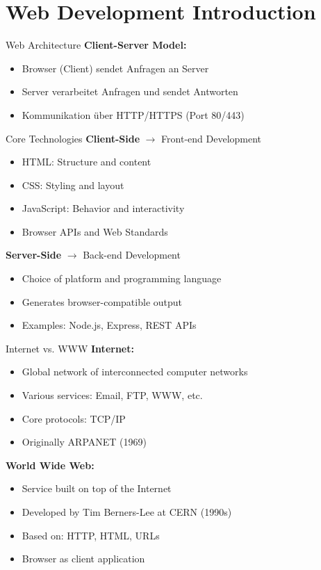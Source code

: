 \section{Web Development Introduction}

\begin{definition}{Web Architecture}
    \textbf{Client-Server Model:}
    \begin{itemize}
        \item Browser (Client) sendet Anfragen an Server
        \item Server verarbeitet Anfragen und sendet Antworten
        \item Kommunikation über HTTP/HTTPS (Port 80/443)
    \end{itemize}
\end{definition}

\begin{concept}{Core Technologies}
    \textbf{Client-Side} $\rightarrow$ Front-end Development
    \begin{itemize}
        \item HTML: Structure and content
        \item CSS: Styling and layout
        \item JavaScript: Behavior and interactivity
        \item Browser APIs and Web Standards
    \end{itemize}

    \textbf{Server-Side} $\rightarrow$ Back-end Development
    \begin{itemize}
        \item Choice of platform and programming language
        \item Generates browser-compatible output
        \item Examples: Node.js, Express, REST APIs
    \end{itemize}
\end{concept}

\begin{theorem}{Internet vs. WWW}
    \textbf{Internet:}
    \begin{itemize}
        \item Global network of interconnected computer networks
        \item Various services: Email, FTP, WWW, etc.
        \item Core protocols: TCP/IP
        \item Originally ARPANET (1969)
    \end{itemize}
    
    \textbf{World Wide Web:}
    \begin{itemize}
        \item Service built on top of the Internet
        \item Developed by Tim Berners-Lee at CERN (1990s)
        \item Based on: HTTP, HTML, URLs
        \item Browser as client application
    \end{itemize}
\end{theorem}

